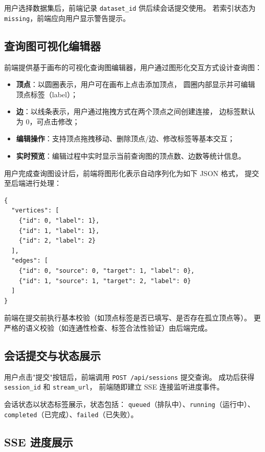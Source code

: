 \documentclass[12pt,a4paper]{article}
\begin{document}
用户选择数据集后，前端记录 \texttt{dataset\_id} 供后续会话提交使用。
若索引状态为 \texttt{missing}，前端应向用户显示警告提示。

\subsection{查询图可视化编辑器}

前端提供基于画布的可视化查询图编辑器，用户通过图形化交互方式设计查询图：

\begin{itemize}
  \item \textbf{顶点}：以圆圈表示，用户可在画布上点击添加顶点，
        圆圈内部显示并可编辑顶点标签（label）；
  \item \textbf{边}：以线条表示，用户通过拖拽方式在两个顶点之间创建连接，
        边标签默认为 $0$，可点击修改；
  \item \textbf{编辑操作}：支持顶点拖拽移动、删除顶点/边、修改标签等基本交互；
  \item \textbf{实时预览}：编辑过程中实时显示当前查询图的顶点数、边数等统计信息。
\end{itemize}

用户完成查询图设计后，前端将图形化表示自动序列化为如下 JSON 格式，
提交至后端进行处理：
\begin{lstlisting}
{
  "vertices": [
    {"id": 0, "label": 1},
    {"id": 1, "label": 1},
    {"id": 2, "label": 2}
  ],
  "edges": [
    {"id": 0, "source": 0, "target": 1, "label": 0},
    {"id": 1, "source": 1, "target": 2, "label": 0}
  ]
}
\end{lstlisting}

前端在提交前执行基本校验（如顶点标签是否已填写、是否存在孤立顶点等）。
更严格的语义校验（如连通性检查、标签合法性验证）由后端完成。

\subsection{会话提交与状态展示}

用户点击"提交"按钮后，前端调用 \texttt{POST /api/sessions} 提交查询。
成功后获得 \texttt{session\_id} 和 \texttt{stream\_url}，
前端随即建立 SSE 连接监听进度事件。

会话状态以状态标签展示，状态包括：
\texttt{queued}（排队中）、\texttt{running}（运行中）、
\texttt{completed}（已完成）、\texttt{failed}（已失败）。

\subsection{SSE 进度展示}
\end{document}
